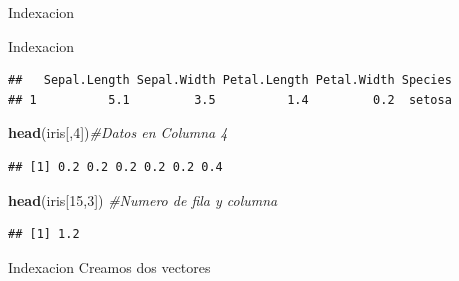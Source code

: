 \documentclass[
  ignorenonframetext,
]{beamer}
\newenvironment{Shaded}{\begin{snugshade}}{\end{snugshade}}
\newcommand{\CommentTok}[1]{\textcolor[rgb]{0.56,0.35,0.01}{\textit{#1}}}
\newcommand{\DecValTok}[1]{\textcolor[rgb]{0.00,0.00,0.81}{#1}}
\newcommand{\FunctionTok}[1]{\textcolor[rgb]{0.13,0.29,0.53}{\textbf{#1}}}
\newcommand{\NormalTok}[1]{#1}
\newcommand{\OtherTok}[1]{\textcolor[rgb]{0.56,0.35,0.01}{#1}}
\newcommand{\SpecialCharTok}[1]{\textcolor[rgb]{0.81,0.36,0.00}{\textbf{#1}}}
\begin{document}
\begin{frame}[fragile]{Indexacion}
\begin{block}{Indexacion}
\begin{verbatim}
##   Sepal.Length Sepal.Width Petal.Length Petal.Width Species
## 1          5.1         3.5          1.4         0.2  setosa
\end{verbatim}

\begin{Shaded}
\begin{Highlighting}[]
\FunctionTok{head}\NormalTok{(iris[,}\DecValTok{4}\NormalTok{])}\CommentTok{\#Datos en Columna 4}
\end{Highlighting}
\end{Shaded}

\begin{verbatim}
## [1] 0.2 0.2 0.2 0.2 0.2 0.4
\end{verbatim}

\begin{Shaded}
\begin{Highlighting}[]
\FunctionTok{head}\NormalTok{(iris[}\DecValTok{15}\NormalTok{,}\DecValTok{3}\NormalTok{])  }\CommentTok{\#Numero de fila y columna}
\end{Highlighting}
\end{Shaded}

\begin{verbatim}
## [1] 1.2
\end{verbatim}
\end{block}

\begin{block}{Indexacion}
\protect\hypertarget{indexacion-3}{}
Creamos dos vectores

\begin{Shaded}
\end{Shaded}


\end{block}
\end{frame}
\end{document}
